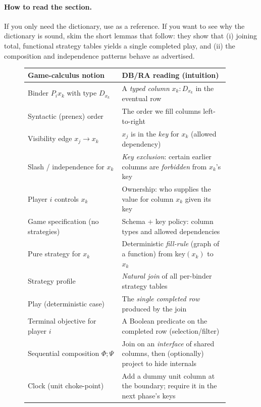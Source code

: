 \paragraph{How to read the section.}
If you only need the dictionary, use  as a
reference.  If you want to see why the dictionary is sound, skim the short
lemmas that follow: they show that (i) joining total, functional strategy
tables yields a single completed play, and (ii) the composition and
independence patterns behave as advertised.

\begin{figure}[t]
  \centering
  \small
  \setlength{\tabcolsep}{6pt}
  \renewcommand{\arraystretch}{1.2}
  \begin{tabular}{p{0.44\linewidth} p{0.50\linewidth}}
    \toprule
    \textbf{Game-calculus notion} & \textbf{DB/RA reading (intuition)} \\
    \midrule
    Binder $P_i x_k$ with type $D_{x_k}$ & A \emph{typed column} $x_k{:}D_{x_k}$ in the eventual row \\
    Syntactic (prenex) order & The order we fill columns left-to-right \\
    Visibility edge $x_j\to x_k$ & $x_j$ is in the \emph{key} for $x_k$ (allowed dependency) \\
    Slash / independence for $x_k$ & \emph{Key exclusion}: certain earlier columns are \emph{forbidden} from $x_k$'s key \\
    Player $i$ controls $x_k$ & Ownership: who supplies the value for column $x_k$ given its key \\
    Game specification (no strategies) & Schema + key policy: column types and allowed dependencies \\
    Pure strategy for $x_k$ & Deterministic \emph{fill-rule} (graph of a function) from key$(x_k)$ to $x_k$ \\
    Strategy profile & \emph{Natural join} of all per-binder strategy tables \\
    Play (deterministic case) & The \emph{single completed row} produced by the join \\
    Terminal objective for player $i$ & A Boolean predicate on the completed row (selection/filter) \\
    Sequential composition $\Phi;\Psi$ & Join on an \emph{interface} of shared columns, then (optionally) project to hide internals \\
    Clock (unit choke-point) & Add a dummy unit column at the boundary; require it in the next phase's keys \\

\end{tabular}
\end{figure}
